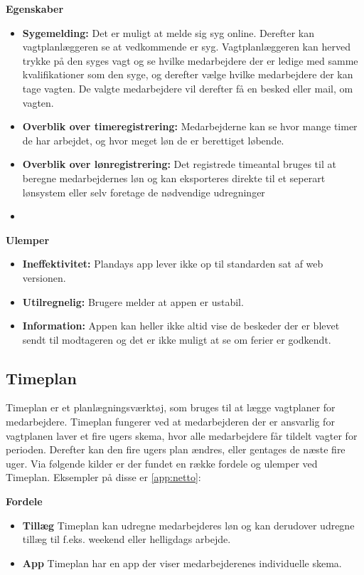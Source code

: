\noindent\textbf{Egenskaber}
\begin{itemize}
\item {\textbf{Sygemelding:} Det er muligt at melde sig syg online. Derefter kan vagtplanlæggeren se at vedkommende er syg. Vagtplanlæggeren kan herved trykke på den syges vagt og se hvilke medarbejdere der er ledige med samme kvalifikationer som den syge, og derefter vælge hvilke medarbejdere der kan tage vagten. De valgte medarbejdere vil derefter få en besked eller mail, om vagten.}
\item {\textbf{Overblik over timeregistrering:} Medarbejderne kan se hvor mange timer de har arbejdet, og hvor meget løn de er berettiget løbende.}
\item{\textbf{Overblik over lønregistrering:} Det registrede timeantal bruges til at beregne medarbejdernes løn og kan eksporteres direkte til et seperart lønsystem eller selv foretage de nødvendige udregninger}
\item{}
\end{itemize} 

\noindent\textbf{Ulemper}
\begin{itemize}
\item {\textbf{Ineffektivitet:} Plandays app lever ikke op til standarden sat af web versionen.} 
\item {\textbf{Utilregnelig:} Brugere melder at appen er ustabil.}
\item {\textbf{Information:} Appen kan heller ikke altid vise de beskeder der er blevet sendt til modtageren og det er ikke muligt at se om ferier er godkendt.} 
\end{itemize}

\subsection{Timeplan}
Timeplan er et planlægningsværktøj, som bruges til at lægge vagtplaner for medarbejdere. Timeplan fungerer ved at medarbejderen der er ansvarlig for vagtplanen laver et fire ugers skema, hvor alle medarbejdere får tildelt vagter for perioden. Derefter kan den fire ugers plan ændres, eller gentages de næste fire uger. Via følgende kilder er der fundet en række fordele og ulemper ved Timeplan. Eksempler på disse er \citep{timeplan} \ref{app:netto}:

\textbf{Fordele}
\begin{itemize}
\item {\textbf{Tillæg} Timeplan kan udregne medarbejderes løn og kan derudover udregne tillæg til f.eks. weekend eller helligdags arbejde.}
\item {\textbf{App} Timeplan har en app der viser medarbejderenes individuelle skema.}
\end{itemize}

